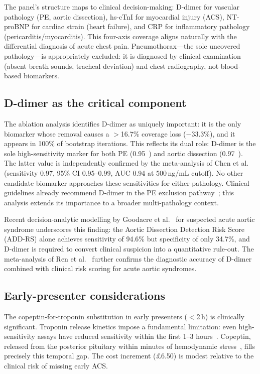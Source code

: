 \documentclass[times, twoside, watermark]{zHenriquesLab-StyleBioRxiv}
\begin{document}
The panel's structure maps to clinical decision-making: D-dimer for vascular pathology (PE, aortic dissection), hs-cTnI for myocardial injury (ACS), NT-proBNP for cardiac strain (heart failure), and CRP for inflammatory pathology (pericarditis/myocarditis). This four-axis coverage aligns naturally with the differential diagnosis of acute chest pain. Pneumothorax---the sole uncovered pathology---is appropriately excluded: it is diagnosed by clinical examination (absent breath sounds, tracheal deviation) and chest radiography, not blood-based biomarkers.

\subsection*{D-dimer as the critical component}

The ablation analysis identifies D-dimer as uniquely important: it is the only biomarker whose removal causes a $>$16.7\% coverage loss ($-33.3\%$), and it appears in 100\% of bootstrap iterations. This reflects its dual role: D-dimer is the sole high-sensitivity marker for both PE (0.95~\cite{Geersing2012}) and aortic dissection (0.97~\cite{Nazerian2014}). The latter value is independently confirmed by the meta-analysis of Chen et al.~\cite{Chen2023} (sensitivity 0.97, 95\% CI 0.95--0.99, AUC 0.94 at 500\,ng/mL cutoff). No other candidate biomarker approaches these sensitivities for either pathology. Clinical guidelines already recommend D-dimer in the PE exclusion pathway~\cite{Wells2000}; this analysis extends its importance to a broader multi-pathology context.

Recent decision-analytic modelling by Goodacre et al.~\cite{Goodacre2025} for suspected acute aortic syndrome underscores this finding: the Aortic Dissection Detection Risk Score (ADD-RS) alone achieves sensitivity of 94.6\% but specificity of only 34.7\%, and D-dimer is required to convert clinical suspicion into a quantitative rule-out. The meta-analysis of Ren et al.~\cite{Ren2024} further confirms the diagnostic accuracy of D-dimer combined with clinical risk scoring for acute aortic syndromes.

\subsection*{Early-presenter considerations}

The copeptin-for-troponin substitution in early presenters ($<$2\,h) is clinically significant. Troponin release kinetics impose a fundamental limitation: even high-sensitivity assays have reduced sensitivity within the first 1--3 hours~\cite{Lipinski2015}. Copeptin, released from the posterior pituitary within minutes of hemodynamic stress~\cite{Keller2011}, fills precisely this temporal gap. The cost increment (\pounds6.50) is modest relative to the clinical risk of missing early ACS.
\end{document}
